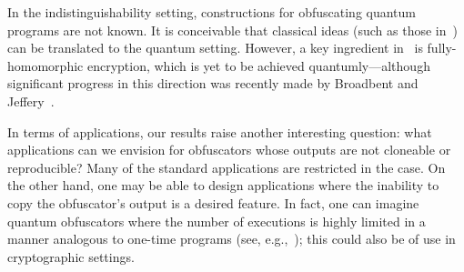 \documentclass[envcountsame]{llncs}
\numberwithin{equation}{section}
\begin{document}
In the indistinguishability setting, constructions for obfuscating quantum programs are not known. It is conceivable that classical ideas (such as those in~\cite{GGHRSW13}) can be translated to the quantum setting. However, a key ingredient in~\cite{GGHRSW13} is fully-homomorphic encryption, which is yet to be achieved quantumly---although significant progress in this direction was recently made by Broadbent and Jeffery~\cite{BJ15}.

In terms of applications, our results raise another interesting question: what applications can we envision for obfuscators whose outputs are not cloneable or reproducible? Many of the standard applications are restricted in the case. On the other hand, one may be able to design applications where the inability to copy the obfuscator's output is a desired feature. In fact, one can imagine quantum obfuscators where the number of executions is highly limited in a manner analogous to one-time programs (see, e.g.,~\cite{BDG13}); this could also be of use in cryptographic settings.

%



\newpage

\appendix
\end{document}
